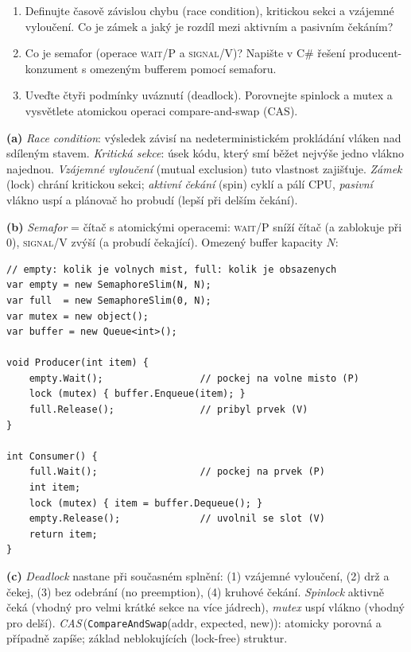 \begin{zadani}
\begin{enumerate}[label=(\alph*)]
  \item {} Definujte časově závislou chybu (race condition), kritickou sekci a vzájemné vyloučení. Co je zámek a jaký je rozdíl mezi aktivním a pasivním čekáním?
  \item {} Co je semafor (operace \textsc{wait}/P a \textsc{signal}/V)? Napište v C\# řešení producent-konzument s omezeným bufferem pomocí semaforu.
  \item {} Uveďte čtyři podmínky uváznutí (deadlock). Porovnejte spinlock a mutex a vysvětlete atomickou operaci compare-and-swap (CAS).
\end{enumerate}
\end{zadani}

\begin{reseni}
\textbf{(a)} \emph{Race condition}: výsledek závisí na nedeterministickém prokládání vláken nad sdíleným stavem. \emph{Kritická sekce}: úsek kódu, který smí běžet nejvýše jedno vlákno najednou. \emph{Vzájemné vyloučení} (mutual exclusion) tuto vlastnost zajišťuje. \emph{Zámek} (lock) chrání kritickou sekci; \emph{aktivní čekání} (spin) cyklí a pálí CPU, \emph{pasivní} vlákno uspí a plánovač ho probudí (lepší při delším čekání).

\textbf{(b)} \emph{Semafor} = čítač s atomickými operacemi: \textsc{wait}/P sníží čítač (a zablokuje při 0), \textsc{signal}/V zvýší (a probudí čekající). Omezený buffer kapacity $N$:
\begin{lstlisting}
// empty: kolik je volnych mist, full: kolik je obsazenych
var empty = new SemaphoreSlim(N, N);
var full  = new SemaphoreSlim(0, N);
var mutex = new object();
var buffer = new Queue<int>();

void Producer(int item) {
    empty.Wait();                 // pockej na volne misto (P)
    lock (mutex) { buffer.Enqueue(item); }
    full.Release();               // pribyl prvek (V)
}

int Consumer() {
    full.Wait();                  // pockej na prvek (P)
    int item;
    lock (mutex) { item = buffer.Dequeue(); }
    empty.Release();              // uvolnil se slot (V)
    return item;
}
\end{lstlisting}

\textbf{(c)} \emph{Deadlock} nastane při současném splnění: (1) vzájemné vyloučení, (2) drž a čekej, (3) bez odebrání (no preemption), (4) kruhové čekání. \emph{Spinlock} aktivně čeká (vhodný pro velmi krátké sekce na více jádrech), \emph{mutex} uspí vlákno (vhodný pro delší). \emph{CAS}\,(\texttt{CompareAndSwap}(addr, expected, new)): atomicky porovná a případně zapíše; základ neblokujících (lock-free) struktur.
\end{reseni}

